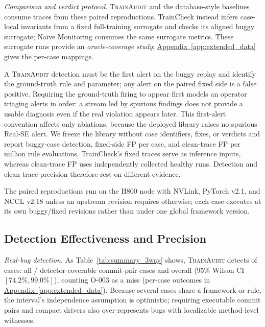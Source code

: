 \documentclass[sigconf,nonacm]{acmart}
\newcommand{\suppappendix}[1]{%
  \href{https://github.com/vivia-an/trainaudit-vldb-artifact/blob/vldb-2027-artifact-v1.0.1/paper/appendix_supplement.pdf}%
  {Appendix~\ref*{#1}}}
\begin{document}
\emph{Comparison and verdict protocol.}
\textsc{TrainAudit} and the database-style baselines consume traces from these
paired reproductions. TrainCheck instead infers case-local invariants from a fixed
full-training surrogate and checks its aligned buggy surrogate; Na\"ive
Monitoring consumes the same surrogate metrics. These surrogate runs provide an
\emph{oracle-coverage study};
\suppappendix{app:extended_data} gives the per-case mappings.

A \textsc{TrainAudit} detection must be the first alert on the buggy replay and
identify the ground-truth rule and parameter; any alert on the paired fixed
side is a false positive. Requiring the ground-truth firing to appear first
models an operator triaging alerts in order: a stream led by spurious findings
does not provide a usable diagnosis even if the real violation appears later.
This first-alert convention affects only ablations,
because the deployed library raises no spurious Real-SE alert. We freeze the
library without case identifiers, fixes, or verdicts and report buggy-case
detection, fixed-side FP per case, and clean-trace FP per million rule
evaluations. TrainCheck's fixed traces serve as inference inputs, whereas
clean-trace FP uses independently collected healthy runs. Detection and
clean-trace precision therefore rest on different evidence.

The paired reproductions run on the H800 node with NVLink, PyTorch v2.1, and NCCL v2.18
unless an upstream revision requires otherwise; each case executes at its own
buggy/fixed revisions rather than under one global framework version.

\subsection{Detection Effectiveness and Precision}
\label{subsec:detection}

\noindent\emph{Real-bug detection.}
As Table~\ref{tab:summary_3way} shows, \textsc{TrainAudit} detects
\NumRealSEDet{} of \NumRealSE{} cases: all
\NumRealSEDet/\NumRealSEReal{} detector-coverable commit-pair cases and
\textbf{\RealSEDetRate} overall (95\% Wilson CI $[74.2\%,99.0\%]$), counting
O-003 as a miss (per-case outcomes in \suppappendix{app:extended_data}).
Because several cases share a framework or rule, the interval's independence
assumption is optimistic; requiring executable commit pairs and compact drivers
also over-represents bugs with localizable method-level witnesses.
\end{document}
